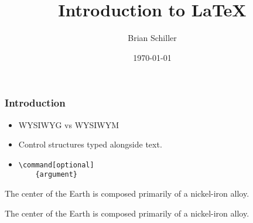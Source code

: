 
\usepackage{verbatim}
\usepackage{moreverb}
\usepackage{multicol}
\usepackage{framed}
\usepackage{listings}
\usepackage{amsmath}
\lstset{ %
language=TeX,
basicstyle=\scriptsize\ttfamily}

\title{Introduction to \LaTeX}
\author{Brian Schiller}
\date{\today}



\frame{\titlepage}

\begin{frame}[fragile]
 \frametitle{Introduction}
 \begin{multicols}{2}
 \begin{itemize}
 	\item[$\bullet$]<1-> WYSIWYG vs WYSIWYM
	\item[$\bullet$]<2-> Control structures typed alongside text.
	\item[$\bullet$]<5-> \begin{verbatim}\command[optional]
	{argument} \end{verbatim}
\end{itemize}

\columnbreak

\pause
\pause
\begin{verbatimtab}
\begin{center} 
	The center of the Earth is 
	composed primarily of 
	a nickel-iron alloy.
\end{center}
\end{verbatimtab}

\pause
\begin{center}
\begin{framed}
\begin{minipage}{0.7\columnwidth}
\begin{center} 
	The center of the Earth is composed primarily of a nickel-iron alloy.
\end{center}
\end{minipage}
\end{framed}
\end{center}

\end{multicols}
\end{frame}


